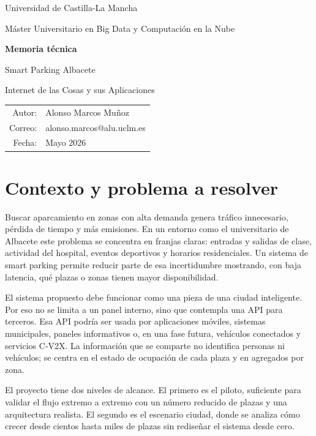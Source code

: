 \documentclass[11pt,a4paper]{article}
\begin{document}
\begin{titlepage}
\centering
{\Large Universidad de Castilla-La Mancha\par}
\vspace{0.5cm}
{\large Máster Universitario en Big Data y Computación en la Nube\par}
\vspace{2.2cm}
{\Huge\bfseries Memoria técnica\par}
\vspace{0.4cm}
{\LARGE Smart Parking Albacete\par}
\vspace{0.8cm}
{\large Internet de las Cosas y sus Aplicaciones\par}
\vfill
\begin{tabular}{rl}
Autor: & Alonso Marcos Muñoz \\
Correo: & alonso.marcos@alu.uclm.es \\
Fecha: & Mayo 2026 \\
\end{tabular}
\vfill
\end{titlepage}

\tableofcontents
\newpage

\section{Contexto y problema a resolver}

Buscar aparcamiento en zonas con alta demanda genera tráfico innecesario, pérdida de tiempo y más emisiones. En un entorno como el universitario de Albacete este problema se concentra en franjas claras: entradas y salidas de clase, actividad del hospital, eventos deportivos y horarios residenciales. Un sistema de smart parking permite reducir parte de esa incertidumbre mostrando, con baja latencia, qué plazas o zonas tienen mayor disponibilidad.

El sistema propuesto debe funcionar como una pieza de una ciudad inteligente. Por eso no se limita a un panel interno, sino que contempla una API para terceros. Esa API podría ser usada por aplicaciones móviles, sistemas municipales, paneles informativos o, en una fase futura, vehículos conectados y servicios C-V2X. La información que se comparte no identifica personas ni vehículos; se centra en el estado de ocupación de cada plaza y en agregados por zona.

El proyecto tiene dos niveles de alcance. El primero es el piloto, suficiente para validar el flujo extremo a extremo con un número reducido de plazas y una arquitectura realista. El segundo es el escenario ciudad, donde se analiza cómo crecer desde cientos hasta miles de plazas sin rediseñar el sistema desde cero.
\end{document}
